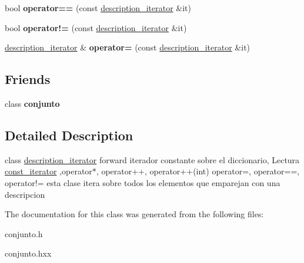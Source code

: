 \begin{DoxyCompactItemize}
\item 
\hypertarget{classconjunto_1_1description__iterator_a2345c529afc081064179771f8ab78f4f}{bool {\bfseries operator==} (const \hyperlink{classconjunto_1_1description__iterator}{description\-\_\-iterator} \&it)}\label{classconjunto_1_1description__iterator_a2345c529afc081064179771f8ab78f4f}

\item 
\hypertarget{classconjunto_1_1description__iterator_a32abef6ce2560b8e042316047aef0572}{bool {\bfseries operator!=} (const \hyperlink{classconjunto_1_1description__iterator}{description\-\_\-iterator} \&it)}\label{classconjunto_1_1description__iterator_a32abef6ce2560b8e042316047aef0572}

\item 
\hypertarget{classconjunto_1_1description__iterator_a2048a3451fb557aaf66a57c1c810d895}{\hyperlink{classconjunto_1_1description__iterator}{description\-\_\-iterator} \& {\bfseries operator=} (const \hyperlink{classconjunto_1_1description__iterator}{description\-\_\-iterator} \&it)}\label{classconjunto_1_1description__iterator_a2048a3451fb557aaf66a57c1c810d895}

\end{DoxyCompactItemize}
\subsection*{Friends}
\begin{DoxyCompactItemize}
\item 
\hypertarget{classconjunto_1_1description__iterator_a42fdcda39c77eabd7380e29fcdbe5dd2}{class {\bfseries conjunto}}\label{classconjunto_1_1description__iterator_a42fdcda39c77eabd7380e29fcdbe5dd2}

\end{DoxyCompactItemize}


\subsection{Detailed Description}
class \hyperlink{classconjunto_1_1description__iterator}{description\-\_\-iterator} forward iterador constante sobre el diccionario, Lectura \hyperlink{classconjunto_1_1const__iterator}{const\-\_\-iterator} ,operator$\ast$, operator++, operator++(int) operator=, operator==, operator!= esta clase itera sobre todos los elementos que emparejan con una descripcion 

The documentation for this class was generated from the following files\-:\begin{DoxyCompactItemize}
\item 
conjunto.\-h\item 
conjunto.\-hxx\end{DoxyCompactItemize}
